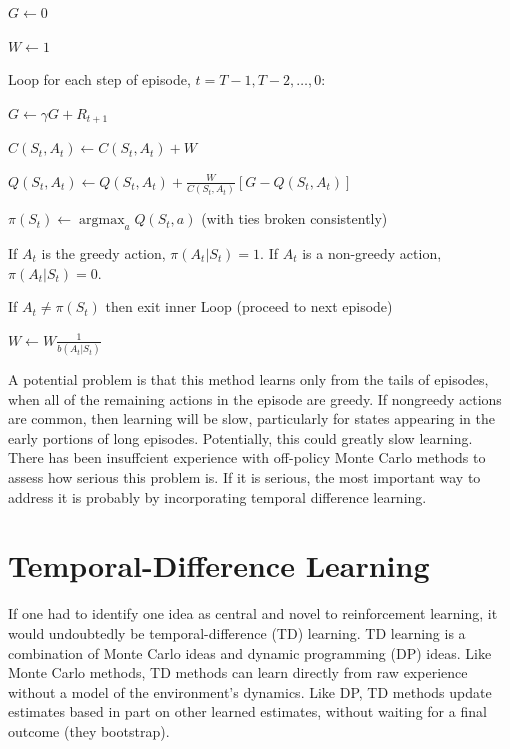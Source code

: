 \documentclass{article}
\begin{document}
\hspace{.5cm} $G \gets 0$

\hspace{.5cm} $W \leftarrow 1$

\hspace{.5cm} Loop for each step of episode, $t = T   -   1 , T   -   2 , \ldots , 0$:

\hspace{1cm} $G \leftarrow \gamma G + R _ { t + 1 }$

\hspace{1cm} $C ( S _ { t } , A _ { t } ) \leftarrow C ( S _ { t } , A _ { t } ) + W$

\hspace{1cm} $Q ( S _ { t } , A _ { t } ) \leftarrow Q ( S _ { t } , A _ { t } ) + \frac { W } { C ( S _ { t } , A _ { t } ) } \left[ G - Q ( S _ { t } , A _ { t } ) \right]$

\hspace{1cm} $\pi ( S _ { t } ) \leftarrow \operatorname { a r g   m a x } _ { a } Q ( S _ { t } , a )$ (with ties broken consistently)

\hspace{1cm} If $ A_{t} $ is the greedy action, \(\pi(A_t\vert{}S_t) = 1\). If $ A_{t} $ is a non-greedy action, \(\pi(A_t\vert{}S_t) = 0\).

\hspace{1cm} If $A _ { t } \neq \pi ( S _ { t } )$ then exit inner Loop (proceed to next episode)

\hspace{1cm} $W \leftarrow W \frac { 1 } { b ( A _ { t } | S _ { t } ) }$

A potential problem is that this method learns only from the tails of episodes, when all of the remaining actions in the episode are greedy. 
If nongreedy actions are common, then learning will be slow, particularly for states appearing in the early portions of long episodes. 
Potentially, this could greatly slow learning. There has been insuffcient experience with off-policy Monte Carlo methods to assess how serious this problem is. 
If it is serious, the most important way to address it is probably by incorporating temporal difference learning.

\section{Temporal-Difference Learning}

If one had to identify one idea as central and novel to reinforcement learning, it would undoubtedly be temporal-difference (TD) learning. 
TD learning is a combination of Monte Carlo ideas and dynamic programming (DP) ideas. Like Monte Carlo methods, TD methods can learn directly 
from raw experience without a model of the environment's dynamics. Like DP, TD methods update estimates based in part on other learned estimates, 
without waiting for a final outcome (they bootstrap).
\end{document}
